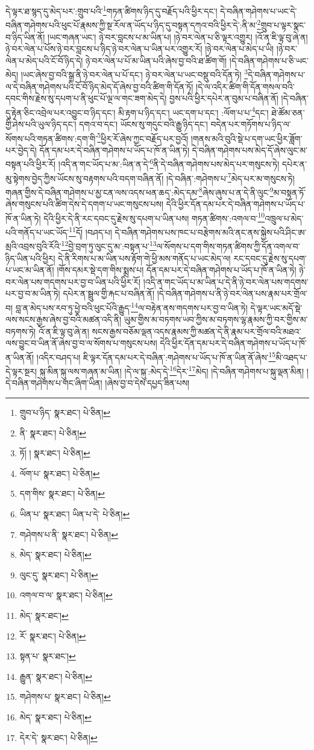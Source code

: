 དེ་ལྟར་ཐ་སྙད་དུ་མེད་པར་:གྲུབ་པའི་\footnote{གྲུབ་པ་ཉིད་  སྣར་ཐང་།  པེ་ཅིན། }གཏན་ཚིགས་ཉིད་དུ་བརྗོད་པའི་ཕྱིར་དང་། དེ་བཞིན་གཤེགས་པ་ཡང་དེ་བཞིན་གཤེགས་པའི་ཕུང་པོ་རྣམས་ཀྱི་སྔ་རོལ་ན་ཡོད་པ་ཉིད་དུ་བསྟན་དཀའ་བའི་ཕྱིར་དེ་:ནི་མ་\footnote{ནི་  སྣར་ཐང་།  པེ་ཅིན། }གྲུབ་པ་ལྟར་སྣང་བ་ཉིད་ཡིན་ནོ། །ཡང་གཞན་ཡང་། ཉེ་བར་བླངས་པ་མ་ཡིན་པ། །ཉེ་བར་ལེན་པ་ཅི་ལྟར་འགྱུར། །འོ་ན་ཇི་ལྟ་བུ་ཞེ་ན། ཉེ་བར་ལེན་པ་པོས་ཉེ་བར་བླངས་པ་ཉིད་ཉེ་བར་ལེན་པ་ཡིན་པར་འགྱུར་རོ། །ཉེ་བར་ལེན་པ་མེད་པ་ཡི། །ཉེ་བར་ལེན་པ་མེད་པའི་ངོ་བོ་ཉིད་དེ། ཉེ་བར་ལེན་པ་པོ་མ་ཡིན་པའི་ཞེས་བྱ་བའི་ཐ་ཚིག་གོ། །དེ་བཞིན་གཤེགས་པ་ཅི་ཡང་མེད། །ཡང་ཞེས་བྱ་བའི་སྒྲ་ནི་ཉེ་བར་ལེན་པ་པོ་དང་། ཉེ་བར་ལེན་པ་ཡང་བསྡུ་བའི་དོན་ཏེ། \footnote{ཏོ། །   སྣར་ཐང་།  པེ་ཅིན། }དེ་བཞིན་གཤེགས་པ་ལ་དེ་བཞིན་གཤེགས་པའི་ངོ་བོ་ཉིད་མེད་དོ་ཞེས་བྱ་བའི་ཚིག་གི་དོན་ཏོ། །དེ་ལ་འདིར་ཚིག་གི་དོན་གསལ་བའི་དབང་གིས་རྗེས་སུ་དཔག་པ་ནི་ཕུང་པོ་ལྔ་ལ་གང་ཟག་མེད་དེ། བྱས་པའི་ཕྱིར་དཔེར་ན་བུམ་པ་བཞིན་ནོ། །དེ་བཞིན་དུ་རྟེན་ཅིང་འབྲེལ་པར་འབྱུང་བ་ཉིད་དང་། མི་རྟག་པ་ཉིད་དང་། ཡང་དག་པ་དང་། :ལོག་པ་པ་\footnote{ལོག་པ་  སྣར་ཐང་།  པེ་ཅིན། }དང་། ཐེ་ཚོམ་ཅན་གྱི་ཤེས་པའི་ཡུལ་ཉིད་དང་། དགའ་བ་དང་། ཡོངས་སུ་གདུང་བའི་རྒྱུ་ཉིད་དང་། བདེན་པར་གཏོགས་པ་ཉིད་ལ་སོགས་པའི་གཏན་ཚིགས་:དག་གི་\footnote{དག་གིས་  སྣར་ཐང་།  པེ་ཅིན། }ཕྱིར་རོ་ཞེས་ཀྱང་བརྗོད་པར་བྱའོ། །གནས་མའི་བུའི་སྡེ་པ་དག་ཡང་ཕྱིར་ཟློག་པར་བྱེད་དེ། དོན་དམ་པར་དེ་བཞིན་གཤེགས་པ་ཡོད་པ་ཁོ་ན་ཡིན་ཏེ། དེ་བཞིན་གཤེགས་པས་མེད་དོ་ཞེས་ལུང་མ་བསྟན་པའི་ཕྱིར་རོ། །འདི་ན་གང་ཡོད་པ་མ་:ཡིན་ན་དེ་\footnote{ཡིན་པ་  སྣར་ཐང་། ཡིན་པ་དེ་  པེ་ཅིན། }ནི་དེ་བཞིན་གཤེགས་པས་མེད་པར་གསུངས་ཏེ། དཔེར་ན་མུ་སྟེགས་བྱེད་ཀྱིས་ཡོངས་སུ་བརྟགས་པའི་བདག་བཞིན་ནོ། །དེ་བཞིན་:གཤེགས་པ་\footnote{གཤེགས་པ་ནི་  སྣར་ཐང་།  པེ་ཅིན། }མེད་པར་མ་གསུངས་ཏེ། གཞན་གྱིས་དེ་བཞིན་གཤེགས་པ་མྱ་ངན་ལས་འདས་ཕན་ཆད་:མེད་དམ་\footnote{མེད་  སྣར་ཐང་།  པེ་ཅིན། }ཞེས་ཞུས་པ་ན་དེ་ནི་ལུང་\footnote{ལུང་དུ་  སྣར་ཐང་།  པེ་ཅིན། }མ་བསྟན་ཏོ་ཞེས་གསུངས་པའི་ཚིག་དེས་དེ་དགག་པ་ཡང་གསུངས་པས། དེའི་ཕྱིར་དོན་དམ་པར་དེ་བཞིན་གཤེགས་པ་ཡོད་པ་ཁོ་ན་ཡིན་ཏེ། དེའི་ཕྱིར་དེ་ནི་རང་དབང་དུ་རྗེས་སུ་དཔག་པ་ཡིན་པས། གཏན་ཚིགས་:འགལ་བ་\footnote{འགལ་བ་ལ་  སྣར་ཐང་།  པེ་ཅིན། }འཁྲུལ་པ་མེད་པའི་གནོད་པ་ཡང་ཡོད་\footnote{མེད་  སྣར་ཐང་། }དོ། །བཤད་པ། དེ་བཞིན་གཤེགས་པས་ཁང་པ་བརྩེགས་མའི་ནང་ནས་སྐྱེས་པའི་ཤིང་ཨ་མྲའི་འབྲས་བུའི་རོའི་\footnote{རོ་  སྣར་ཐང་།  པེ་ཅིན། }བྱེ་བྲག་ཏུ་ལུང་དུ་མ་:བསྟན་པ་\footnote{སྟན་པ་  སྣར་ཐང་། }ལ་སོགས་པ་དག་གིས་གཏན་ཚིགས་ཀྱི་དོན་འགལ་བ་ཉིད་ཡིན་པའི་ཕྱིར། དེ་ནི་རིགས་པ་མ་ཡིན་པས་རྟོག་གེ་ཕྱི་མས་གནོད་པ་ཡང་མེད་ལ། རང་དབང་དུ་རྗེས་སུ་དཔག་པ་ཡང་མ་ཡིན་ནོ། །གོས་དམར་སྡེ་དག་གིས་སྨྲས་པ། དོན་དམ་པར་དེ་བཞིན་གཤེགས་པ་ཡོད་པ་ཁོ་ན་ཡིན་ཏེ། ཉེ་བར་ལེན་པས་གདགས་པར་བྱ་བ་ཡིན་པའི་ཕྱིར་རོ། །འདི་ན་གང་ཡོད་པ་མ་ཡིན་པ་དེ་ནི་ཉེ་བར་ལེན་པས་གདགས་པར་བྱ་བ་མ་ཡིན་ཏེ། དཔེར་ན་སྦྲུལ་གྱི་རྐང་པ་བཞིན་ནོ། །དེ་བཞིན་གཤེགས་པ་ནི་ཉེ་བར་ལེན་པས་རྣམ་པར་གྲོལ་བ། བླ་ན་མེད་པས་རབ་ཏུ་ཕྱེ་བའི་ཕུང་པོའི་རྒྱུད་\footnote{རྒྱུན་  སྣར་ཐང་།  པེ་ཅིན། }ལ་བརྟེན་ནས་གདགས་པར་བྱ་བ་ཡིན་ཏེ། དེ་ལྟར་ཡང་མདོ་སྡེ་ལས་སངས་རྒྱས་ཞེས་བྱ་བའི་མཚན་འདི་ནི། ཡུམ་གྱིས་མ་བཏགས་ཡབ་ཀྱིས་མ་བཏགས་ལྷ་རྣམས་ཀྱི་བར་གྱིས་མ་བཏགས་ཏེ། འོ་ན་ཇི་ལྟ་བུ་ཞེ་ན། སངས་རྒྱས་བཅོམ་ལྡན་འདས་རྣམས་ཀྱི་མཚན་དེ་ནི་རྣམ་པར་གྲོལ་བའི་མཐའ་ལས་བྱུང་བ་ཡིན་ནོ་ཞེས་བྱ་བ་ལ་སོགས་པ་གསུངས་པས། དེའི་ཕྱིར་དོན་དམ་པར་དེ་བཞིན་གཤེགས་པ་ཡོད་པ་ཁོ་ན་ཡིན་ནོ། །འདིར་བཤད་པ། ཇི་ལྟར་དོན་དམ་པར་དེ་བཞིན་:གཤེགས་པ་ཡོད་པ་ཁོ་ན་ཡིན་ནོ་ཞེས་\footnote{གཤེགས་པ་  སྣར་ཐང་།  པེ་ཅིན། }མི་འཐད་པ་དེ་ལྟར་སྔར། སྐུ་མིན་སྐུ་ལས་གཞན་མ་ཡིན། །དེ་ལ་སྐུ་:མེད་དེ་\footnote{མེད་  སྣར་ཐང་།  པེ་ཅིན། }དེར་\footnote{དེར་དེ་  སྣར་ཐང་།  པེ་ཅིན། }མེད། །དེ་བཞིན་གཤེགས་པ་སྐུ་ལྡན་མིན། །དེ་བཞིན་གཤེགས་པ་གང་ཞིག་ཡིན། །ཞེས་བྱ་བ་དེས་དཔྱད་ཟིན་པས། 